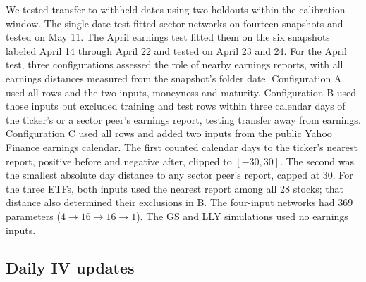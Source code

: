 We tested transfer to withheld dates using two holdouts within the calibration window. The single-date test fitted sector networks on fourteen snapshots and tested on May 11. The April earnings test fitted them on the six snapshots labeled April 14 through April 22 and tested on April 23 and 24. For the April test, three configurations assessed the role of nearby earnings reports, with all earnings distances measured from the snapshot's folder date. Configuration A used all rows and the two inputs, moneyness and maturity. Configuration B used those inputs but excluded training and test rows within three calendar days of the ticker's or a sector peer's earnings report, testing transfer away from earnings. Configuration C used all rows and added two inputs from the public Yahoo Finance earnings calendar. The first counted calendar days to the ticker's nearest report, positive before and negative after, clipped to $[-30,30]$. The second was the smallest absolute day distance to any sector peer's report, capped at 30. For the three ETFs, both inputs used the nearest report among all 28 stocks; that distance also determined their exclusions in B. The four-input networks had 369 parameters ($4\to16\to16\to1$). The GS and LLY simulations used no earnings inputs.

\subsection{Daily IV updates}\label{sec:theta_function}

